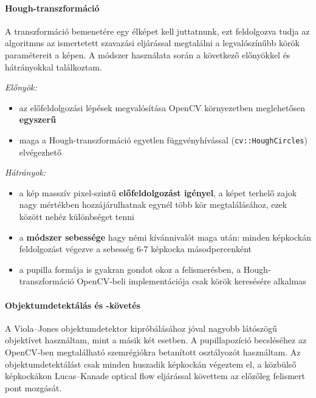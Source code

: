 \paragraph{Hough-transzformáció}

A transzformáció bemenetére egy élképet kell juttatnunk, ezt feldolgozva tudja az algoritmus az ismertetett szavazási eljárással megtalálni a legvalószínűbb körök paramétereit a képen. A módszer használata során a következő előnyökkel és hátrányokkal találkoztam.

\medskip

\emph{Előnyök:}

\begin{itemize}
  \item az előfeldolgozási lépések megvalósítása OpenCV környezetben meglehetősen \textbf{egyszerű}
  \item maga a Hough-transzformáció egyetlen függvényhívással (\texttt{cv::HoughCircles}) elvégezhető
\end{itemize}

\emph{Hátrányok:}

\begin{itemize}
  \item a kép masszív pixel-szintű \textbf{előfeldolgozást igényel}, a képet terhelő zajok nagy mértékben hozzájárulhatnak egynél több kör megtalálásához, ezek között nehéz különbséget tenni
  \item a \textbf{módszer sebessége} hagy némi kívánnivalót maga után: minden képkockán feldolgozást végezve a sebesség 6-7 képkocka másodpercenként
  \item a pupilla formája is gyakran gondot okoz a felismerésben, a Hough-transzformáció OpenCV-beli implementációja csak körök keresésére alkalmas
\end{itemize}

\medskip
\paragraph{Objektumdetektálás és -követés}

A Viola--Jones objektumdetektor kipróbálásához jóval nagyobb látószögű objektívet használtam, mint a másik két esetben. A pupillapozíció becsléséhez az OpenCV-ben megtalálható szemrégiókra betanított osztályozót használtam. Az objektumdetektálást csak minden huszadik képkockán végeztem el, a közbülső képkockákon Lucas--Kanade optical flow eljárással követtem az előzőleg felismert pont mozgását.

\medskip

